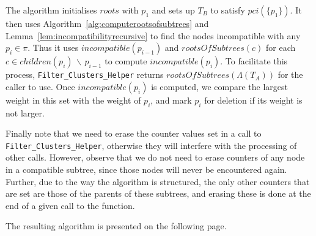 \documentclass{article}
\newcommand{\leafset}{\Lambda}
\begin{document}
    The algorithm initialises $roots$ with $p_1$ and sets up $T_B$ to satisfy $pci(\{p_1\})$. It then uses Algorithm~\ref{alg:computerootsofsubtrees} and Lemma~\ref{lem:incompatibilityrecursive} to find the nodes incompatible with any $p_i \in \pi$. Thus it uses $incompatible(p_{i-1})$ and $rootsOfSubtrees(c)$ for each $c \in children(p_i)\, \backslash\, p_{i-1}$ to compute $incompatible(p_i)$. To facilitate this process, \texttt{Filter\_Clusters\_Helper} returns $rootsOfSubtrees(\leafset(T_A))$ for the caller to use. Once $incompatible(p_i)$ is computed, we compare the largest weight in this set with the weight of $p_i$, and mark $p_i$ for deletion if its weight is not larger.

    Finally note that we need to erase the counter values set in a call to \texttt{Filter\_Clusters\_Helper}, otherwise they will interfere with the processing of other calls. However, observe that we do not need to erase counters of any node in a compatible subtree, since those nodes will never be encountered again. Further, due to the way the algorithm is structured, the only other counters that are set are those of the parents of these subtrees, and erasing these is done at the end of a given call to the function.

    The resulting algorithm is presented on the following page.
\end{document}

